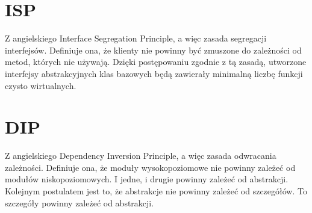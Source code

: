 \section{ISP}
Z angielskiego Interface Segregation Principle, a więc zasada segregacji interfejsów.
Definiuje ona, że klienty nie powinny być zmuszone do zależności od metod, których nie używają.
Dzięki postępowaniu zgodnie z tą zasadą, utworzone interfejsy abstrakcyjnych klas bazowych będą zawierały minimalną liczbę funkcji czysto wirtualnych.

\section{DIP}
Z angielskiego Dependency Inversion Principle, a więc zasada odwracania zależności.
Definiuje ona, że moduły wysokopoziomowe nie powinny zależeć od modułów niskopoziomowych. I jedne, i drugie powinny zależeć od abstrakcji.
Kolejnym postulatem jest to, że abstrakcje nie powinny zależeć od szczegółów. To szczegóły powinny zależeć od abstrakcji.

